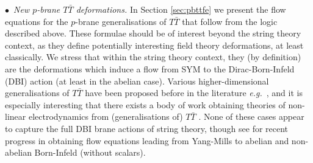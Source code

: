 \documentclass[11pt]{article}
\renewcommand{\emph}[1]{\textit{#1}}
\begin{document}
\vspace{3mm}

\noindent $\bullet$~\emph{New $p$-brane $T \bar{T}$ deformations.} In Section \ref{sec:pbttfe} we present the flow equations for the $p$-brane generalisations of $T \bar T$ that follow from the logic described above.
These formulae should be of interest beyond the string theory context, as they define potentially interesting field theory deformations, at least classically.
We stress that within the string theory context, they (by definition) are the deformations which induce a flow from SYM to the Dirac-Born-Infeld (DBI) action (at least in the abelian case).
Various higher-dimensional generalisations of $T \bar T$ have been proposed before in the literature \emph{e.g.}~\cite{Bonelli:2018kik,Cardy:2018sdv,Taylor:2018xcy}, and it is especially interesting that there exists a body of work obtaining theories of non-linear electrodynamics from (generalisations of) $T \bar T$ \cite{Conti:2018jho,Brennan:2019azg, Babaei-Aghbolagh:2020kjg, Babaei-Aghbolagh:2022uij,Ferko:2022iru,Conti:2022egv,Ferko:2022cix, Babaei-Aghbolagh:2022leo,Ferko:2023sps,Ferko:2024yua}. None of these cases appear to capture the full DBI brane actions of string theory, though see \cite{Ferko:2023sps, Ferko:2024yua} for recent progress in obtaining flow equations leading from Yang-Mills to abelian and non-abelian Born-Infeld (without scalars). 
\end{document}

